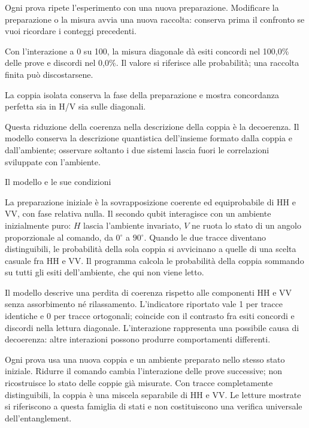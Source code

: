 Ogni prova ripete l'esperimento con una nuova preparazione. Modificare la preparazione o la misura avvia una nuova raccolta: conserva prima il confronto se vuoi ricordare i conteggi precedenti.\par


Con l'interazione a 0 su 100, la misura diagonale dà esiti concordi nel 100,0\% delle prove e discordi nel 0,0\%. Il valore si riferisce alle probabilità; una raccolta finita può discostarsene.\par

La coppia isolata conserva la fase della preparazione e mostra concordanza perfetta sia in H/V sia sulle diagonali.\par

Questa riduzione della coerenza nella descrizione della coppia è la decoerenza. Il modello conserva la descrizione quantistica dell'insieme formato dalla coppia e dall'ambiente; osservare soltanto i due sistemi lascia fuori le correlazioni sviluppate con l'ambiente.\par


Il modello e le sue condizioni\par

La preparazione iniziale è la sovrapposizione coerente ed equiprobabile di HH e VV, con fase relativa nulla. Il secondo qubit interagisce con un ambiente inizialmente puro: \(H\) lascia l'ambiente invariato, \(V\) ne ruota lo stato di un angolo proporzionale al comando, da \(0{}^{\circ} \) a \(90{}^{\circ} \). Quando le due tracce diventano distinguibili, le probabilità della sola coppia si avvicinano a quelle di una scelta casuale fra HH e VV. Il programma calcola le probabilità della coppia sommando su tutti gli esiti dell'ambiente, che qui non viene letto.\par

Il modello descrive una perdita di coerenza rispetto alle componenti HH e VV senza assorbimento né rilassamento. L'indicatore riportato vale 1 per tracce identiche e 0 per tracce ortogonali; coincide con il contrasto fra esiti concordi e discordi nella lettura diagonale. L'interazione rappresenta una possibile causa di decoerenza: altre interazioni possono produrre comportamenti differenti.\par

Ogni prova usa una nuova coppia e un ambiente preparato nello stesso stato iniziale. Ridurre il comando cambia l'interazione delle prove successive; non ricostruisce lo stato delle coppie già misurate. Con tracce completamente distinguibili, la coppia è una miscela separabile di HH e VV. Le letture mostrate si riferiscono a questa famiglia di stati e non costituiscono una verifica universale dell'entanglement.\par


